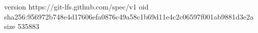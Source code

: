 version https://git-lfs.github.com/spec/v1
oid sha256:956972b748e4d17606efa0876c49a58c1b69d11e4c2c06597f001ab9881d3e2a
size 535883
